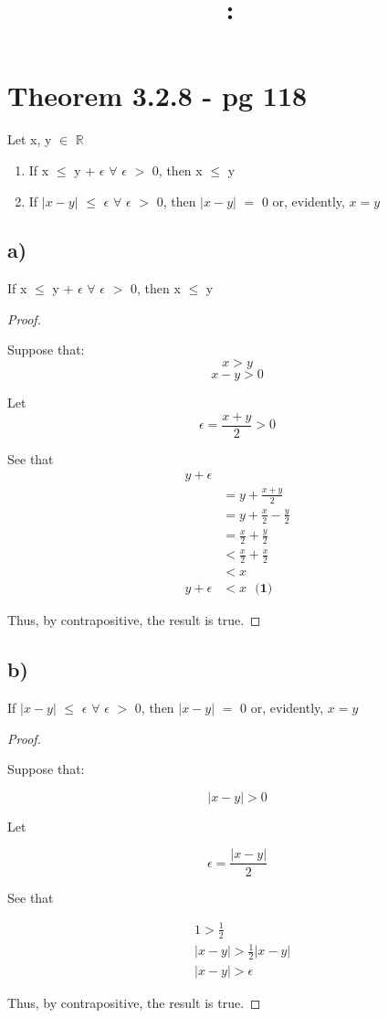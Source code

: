 \documentclass{article}
\title{
    \vspace{2in}
    \textmd{\textbf{\hmwkClass:\ \hmwkTitle}}\\
    \normalsize\vspace{0.1in}\small\vspace{0.1in}\large{\textit{\hmwkClassInstructor}}
    \vspace{3in}
}
\author{\hmwkAuthorName}
\date{}
\newcommand\bsc[2][\DefaultOpt]{%
  \def\DefaultOpt{#2}%
  \section[#1]{#2}%
}
\newcommand\ssc[2][\DefaultOpt]{%
  \def\DefaultOpt{#2}%
  \subsection[#1]{#2}%
}
\newcommand{\bgpf}{\begin{proof} $ $\newline}
\newcommand{\balist}{\begin{enumerate}[label=\alph*.]}
\newcommand{\elist}{\end{enumerate}}
\newcommand{\bgsp}{\begin{split}}
\newcommand\prs[1]{~~~\textbf{(#1)}}
\newcommand{\epf}{\end{proof}}
\newcommand{\ep}{\epsilon}         %
\newcommand{\fa}{\forall}          %
\begin{document}
\bsc{Theorem 3.2.8 - pg 118}

Let x, y $\in$ $\mathbb{R}$

\balist
\item If x $\leq$ y + $\ep$ $\fa$ $\ep$ $>$ $0$, then x $\leq$ y
\item If $|x - y|$ $\leq$ $\ep$ $\fa$ $\ep$ $>$ $0$, then $|x - y|$ $=$ $0$ or, evidently, $x = y$
\elist

\ssc{a)}
If x $\leq$ y + $\ep$ $\fa$ $\ep$ $>$ $0$, then x $\leq$ y
\bgpf

Suppose that:
$$ x > y $$
$$ x - y > 0 $$

\bigskip

Let $$ \ep = \frac{x + y}{2} > 0$$

See that
\[
            \bgsp
                y + \ep  & 
                \\
                &= y + \frac{x + y}{2}
                \\
                &= y + \frac{x}{2} - \frac{y}{2}
                \\
                &= \frac{x}{2} + \frac{y}{2}
                \\
                &< \frac{x}{2} + \frac{x}{2}
                \\
                &< x
                \\
                y + \ep  &< x \prs{1}
            \end{split}
\]

Thus, by contrapositive, the result is true.

\epf
\pagebreak
\ssc{b)}

If $|x - y|$ $\leq$ $\ep$ $\fa$ $\ep$ $>$ $0$, then $|x - y|$ $=$ $0$ or, evidently, $x = y$

\bgpf

Suppose that:

$$|x - y| > 0$$

Let

$$ \ep = \frac{|x - y|}{2} $$

See that

\[
            \bgsp
                &1 > \frac{1}{2}
                \\
                &|x - y| > \frac{1}{2}|x - y|
                \\
                &|x - y| > \epsilon
            \end{split}
\]

Thus, by contrapositive, the result is true.

\epf
\end{document}
